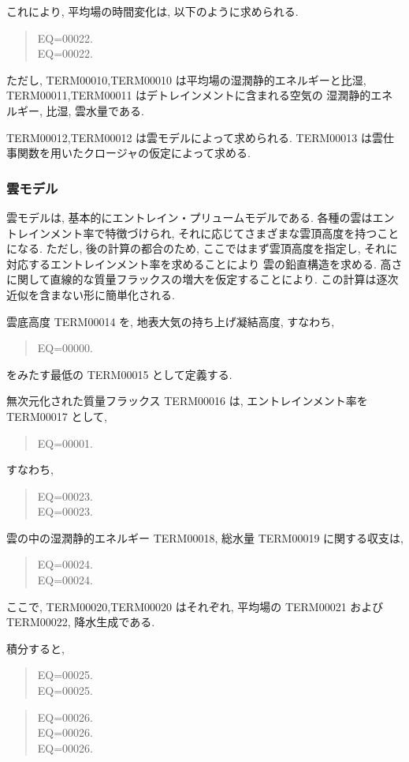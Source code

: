 これにより, 平均場の時間変化は, 以下のように求められる.
\begin{quote}
EQ=00022.\\
EQ=00022.
\end{quote}
ただし, TERM00010,TERM00010 は平均場の湿潤静的エネルギーと比湿,
TERM00011,TERM00011 はデトレインメントに含まれる空気の
湿潤静的エネルギー, 比湿, 雲水量である.

TERM00012,TERM00012 は雲モデルによって求められる.
TERM00013 は雲仕事関数を用いたクロージャの仮定によって求める.

\subsubsection{雲モデル}

雲モデルは, 基本的にエントレイン・プリュームモデルである.
各種の雲はエントレインメント率で特徴づけられ,
それに応じてさまざまな雲頂高度を持つことになる.
ただし, 後の計算の都合のため, 
ここではまず雲頂高度を指定し, 
それに対応するエントレインメント率を求めることにより
雲の鉛直構造を求める.
高さに関して直線的な質量フラックスの増大を仮定することにより.
この計算は逐次近似を含まない形に簡単化される.

雲底高度 TERM00014 を, 
地表大気の持ち上げ凝結高度, すなわち,
\begin{quote}
EQ=00000.
\end{quote}
をみたす最低の TERM00015 として定義する.

無次元化された質量フラックス TERM00016 は, 
エントレインメント率を TERM00017 として,
\begin{quote}
EQ=00001.
\end{quote}
すなわち,
\begin{quote}
\nonumber
EQ=00023.\\
EQ=00023.
\end{quote}

雲の中の湿潤静的エネルギー TERM00018, 総水量 TERM00019 に関する収支は,
\begin{quote}
EQ=00024.\\
EQ=00024.
\end{quote}
ここで, TERM00020,TERM00020 はそれぞれ,
平均場の TERM00021 および TERM00022, 降水生成である.

積分すると,
\begin{quote}
\nonumber
EQ=00025.\\
EQ=00025.
\end{quote}
\begin{quote}
\nonumber
EQ=00026.\\
\nonumber
EQ=00026.\\
EQ=00026.
\end{quote}

